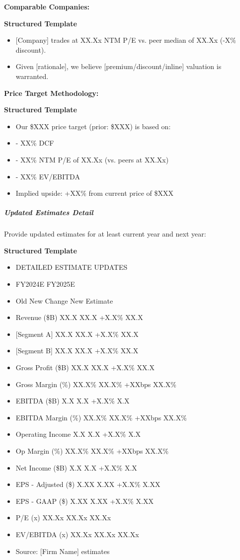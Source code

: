\documentclass[11pt]{article}
\begin{document}
\textbf{Comparable Companies:}

\textbf{Structured Template}
\begin{itemize}[leftmargin=*,itemsep=2pt,topsep=2pt]
\item {} [Company] trades at XX.Xx NTM P/E vs. peer median of XX.Xx (-X\% discount).
\item {} Given [rationale], we believe [premium/discount/inline] valuation is warranted.
\end{itemize}

\textbf{Price Target Methodology:}

\textbf{Structured Template}
\begin{itemize}[leftmargin=*,itemsep=2pt,topsep=2pt]
\item {} Our \$XXX price target (prior: \$XXX) is based on:
\item {} - XX\% DCF
\item {} - XX\% NTM P/E of XX.Xx (vs. peers at XX.Xx)
\item {} - XX\% EV/EBITDA
\item {} Implied upside: +XX\% from current price of \$XXX
\end{itemize}

\subparagraph{Updated Estimates Detail}\mbox{}\par

Provide updated estimates for at least current year and next year:


\textbf{Structured Template}
\begin{itemize}[leftmargin=*,itemsep=2pt,topsep=2pt]
\item {} DETAILED ESTIMATE UPDATES
\item {} FY2024E FY2025E
\item {} Old New Change New Estimate
\item {} Revenue (\$B) XX.X XX.X +X.X\% XX.X
\item {} [Segment A] XX.X XX.X +X.X\% XX.X
\item {} [Segment B] XX.X XX.X +X.X\% XX.X
\item {} Gross Profit (\$B) XX.X XX.X +X.X\% XX.X
\item {} Gross Margin (\%) XX.X\% XX.X\% +XXbps XX.X\%
\item {} EBITDA (\$B) X.X X.X +X.X\% X.X
\item {} EBITDA Margin (\%) XX.X\% XX.X\% +XXbps XX.X\%
\item {} Operating Income X.X X.X +X.X\% X.X
\item {} Op Margin (\%) XX.X\% XX.X\% +XXbps XX.X\%
\item {} Net Income (\$B) X.X X.X +X.X\% X.X
\item {} EPS - Adjusted (\$) X.XX X.XX +X.X\% X.XX
\item {} EPS - GAAP (\$) X.XX X.XX +X.X\% X.XX
\item {} P/E (x) XX.Xx XX.Xx XX.Xx
\item {} EV/EBITDA (x) XX.Xx XX.Xx XX.Xx
\item {} Source: [Firm Name] estimates
\end{itemize}
\end{document}
